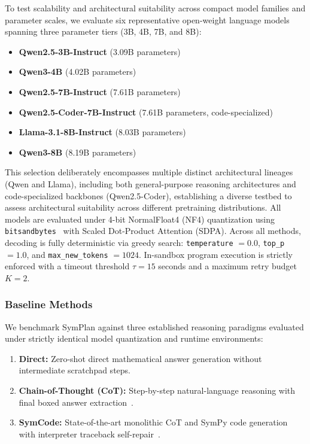 \documentclass[runningheads]{llncs}
\begin{document}
To test scalability and architectural suitability across compact model families and parameter scales, we evaluate six representative open-weight language models spanning three parameter tiers (3B, 4B, 7B, and 8B):
\begin{itemize}
    \item \textbf{Qwen2.5-3B-Instruct} (3.09B parameters)~\cite{qwen2024qwen25}
    \item \textbf{Qwen3-4B} (4.02B parameters)~\cite{qwen2024qwen25}
    \item \textbf{Qwen2.5-7B-Instruct} (7.61B parameters)~\cite{qwen2024qwen25}
    \item \textbf{Qwen2.5-Coder-7B-Instruct} (7.61B parameters, code-specialized)~\cite{hui2024qwen25coder}
    \item \textbf{Llama-3.1-8B-Instruct} (8.03B parameters)~\cite{dubey2024llama3}
    \item \textbf{Qwen3-8B} (8.19B parameters)~\cite{qwen2024qwen25}
\end{itemize}
This selection deliberately encompasses multiple distinct architectural lineages (Qwen and Llama), including both general-purpose reasoning architectures and code-specialized backbones (Qwen2.5-Coder), establishing a diverse testbed to assess architectural suitability across different pretraining distributions. All models are evaluated under 4-bit NormalFloat4 (NF4) quantization using \texttt{bitsandbytes}~\cite{dettmers2023qlora} with Scaled Dot-Product Attention (SDPA). Across all methods, decoding is fully deterministic via greedy search: \texttt{temperature} $= 0.0$, \texttt{top\_p} $= 1.0$, and \texttt{max\_new\_tokens} $= 1024$. In-sandbox program execution is strictly enforced with a timeout threshold $\tau = 15$ seconds and a maximum retry budget $K = 2$.

\subsubsection{Baseline Methods}

We benchmark SymPlan against three established reasoning paradigms evaluated under strictly identical model quantization and runtime environments:
\begin{enumerate}
    \item \textbf{Direct:} Zero-shot direct mathematical answer generation without intermediate scratchpad steps.
    \item \textbf{Chain-of-Thought (CoT):} Step-by-step natural-language reasoning with final boxed answer extraction~\cite{wei2022cot}.
    \item \textbf{SymCode:} State-of-the-art monolithic CoT and SymPy code generation with interpreter traceback self-repair~\cite{nezhad2025symcode}.
\end{enumerate}
\end{document}
